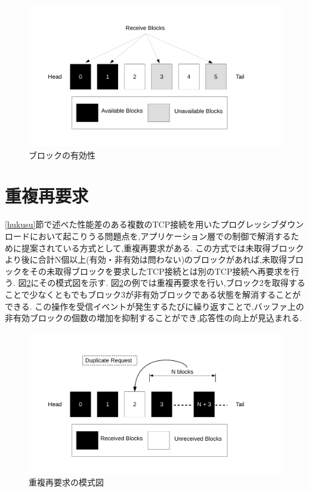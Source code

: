 \documentclass[a4j,12pt]{gradthesis_utf8}
\begin{document}
\begin{figure}[ht]
	\centering
	\includegraphics[width=18cm]{figure/block.pdf}
	\caption{ブロックの有効性}
	\label{block}
\end{figure}

 \section{重複再要求}
 \label{juhuku}
 \ref{hukusu}節で述べた性能差のある複数のTCP接続を用いたプログレッシブダウンロードにおいて起こりうる問題点を,アプリケーション層での制御で解消するために提案されている方式として,重複再要求がある.
 この方式では未取得ブロックより後に合計N個以上(有効・非有効は問わない)のブロックがあれば,未取得ブロックをその未取得ブロックを要求したTCP接続とは別のTCP接続へ再要求を行う.
 図\ref{blockdup}にその模式図を示す.
 図\ref{blockdup}の例では重複再要求を行い,ブロック2を取得することで少なくともでもブロック3が非有効ブロックである状態を解消することができる.
 この操作を受信イベントが発生するたびに繰り返すことで,バッファ上の非有効ブロックの個数の増加を抑制することができ,応答性の向上が見込まれる.
 
 \begin{figure}[ht]
     \centering
     \includegraphics[width=18cm]{figure/block_dup.pdf}
     \caption{重複再要求の模式図}
     \label{blockdup}
 \end{figure}
\end{document}
